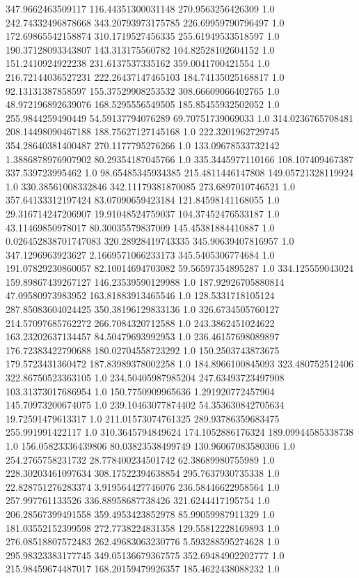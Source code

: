 347.9662463509117	116.44351300031148	270.9563256426309	1.0
242.74332496878668	343.20793973175785	226.69959790796497	1.0
172.69865542158874	310.1719527456335	255.61949533518597	1.0
190.37128093343807	143.313175560782	104.82528102604152	1.0
151.2410924922238	231.6137537335162	359.0041700421554	1.0
216.72144036527231	222.26437147465103	184.74135025168817	1.0
92.13131387858597	155.37529908253532	308.66609066402765	1.0
48.972196892639076	168.5295556549505	185.85455932502052	1.0
255.9844259490449	54.59137794076289	69.70751739069033	1.0
314.0236765708481	208.14498090467188	188.75627127145168	1.0
222.3201962729745	354.28640381400487	270.1177795276266	1.0
133.09678533732142	1.3886878976907902	80.29354187045766	1.0
335.3445977110166	108.107409467387	337.539723995462	1.0
98.65485345934385	215.4811446147808	149.05721328119924	1.0
330.38561008332846	342.11179381870085	273.6897010746521	1.0
357.64133312197424	83.07090659423184	121.84598141168055	1.0
29.316714247206907	19.91048524759037	104.37452476533187	1.0
43.11469850978017	80.30035579837009	145.45381884410887	1.0
0.026452838701747083	320.28928419743335	345.90639407816957	1.0
347.1296963923627	2.1669571066233173	345.5405306774684	1.0
191.07829230860057	82.10014694703082	59.56597354895287	1.0
334.125559043024	159.89867439267127	146.23539590129988	1.0
187.92926705880814	47.09580973983952	163.81883913465546	1.0
128.5331718105124	287.85083604024425	350.38196129833136	1.0
326.6734505760127	214.57097685762272	266.7084320712588	1.0
243.3862451024622	163.23202637134457	84.50479693992953	1.0
236.46157698089897	176.72383422790688	180.02704558723292	1.0
150.2503743873675	179.5723431360472	187.83989378002258	1.0
184.8966100845093	323.480752512406	322.86750523363105	1.0
234.50405987985204	247.63493723497908	103.31373017686954	1.0
150.7750909965636	1.291920772457904	145.70973200674075	1.0
239.10463077874402	54.353630842705634	19.72591479613317	1.0
211.01573074761325	289.93786359683475	255.991991422117	1.0
310.3645794849624	174.1052886176324	189.09944585338738	1.0
156.05823336439806	80.03823538499749	130.96067083580306	1.0
254.2765758231732	28.778400234501742	62.38689980755989	1.0
228.30203461097634	308.17522394638854	295.7637930735338	1.0
22.828751276283374	3.919564427746076	236.58446622958564	1.0
257.997761133526	336.88958687738426	321.6244417195754	1.0
206.28567399491558	359.4953423852978	85.99059987911329	1.0
181.03552152399598	272.7738224831358	129.55812228169893	1.0
276.08518807572483	262.49683063230776	5.593288595274628	1.0
295.98323383177745	349.05136679367575	352.69484902202777	1.0
215.98459674487017	168.20159479926357	185.4622438088232	1.0
